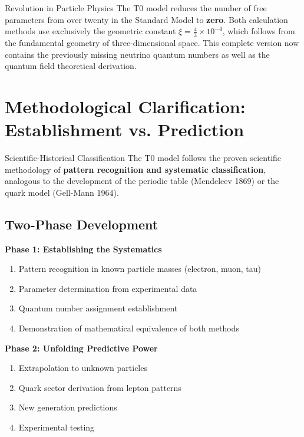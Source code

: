 \documentclass[12pt,a4paper]{article}
\newcommand{\xipar}{\xi}
\begin{document}
	\begin{important}{Revolution in Particle Physics}{}
		The T0 model reduces the number of free parameters from over twenty in the Standard Model to \textbf{zero}. Both calculation methods use exclusively the geometric constant $\xipar = \frac{4}{3} \times 10^{-4}$, which follows from the fundamental geometry of three-dimensional space. This complete version now contains the previously missing neutrino quantum numbers as well as the quantum field theoretical derivation.
	\end{important}
	
	\section{Methodological Clarification: Establishment vs. Prediction}
	\label{sec:methodological_clarification}
	
	\begin{important}{Scientific-Historical Classification}{}
		The T0 model follows the proven scientific methodology of \textbf{pattern recognition and systematic classification}, analogous to the development of the periodic table (Mendeleev 1869) or the quark model (Gell-Mann 1964).
	\end{important}
	
	\subsection{Two-Phase Development}
	\label{subsec:two_phases}
	
	\textbf{Phase 1: Establishing the Systematics}
	\begin{enumerate}
		\item Pattern recognition in known particle masses (electron, muon, tau)
		\item Parameter determination from experimental data
		\item Quantum number assignment establishment
		\item Demonstration of mathematical equivalence of both methods
	\end{enumerate}
	
	\textbf{Phase 2: Unfolding Predictive Power}
	\begin{enumerate}
		\item Extrapolation to unknown particles
		\item Quark sector derivation from lepton patterns
		\item New generation predictions
		\item Experimental testing
	\end{enumerate}
	
\end{document}
